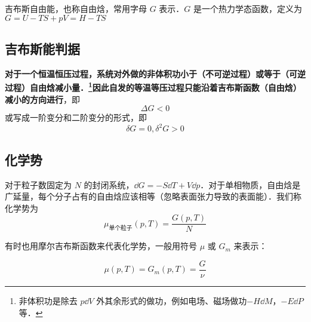 
\begin{issues}
\end{issues}


吉布斯自由能，也称自由焓，常用字母 $G$ 表示．$G$ 是一个热力学态函数，定义为$G=U-TS+pV=H-TS$

\subsection{吉布斯能判据}
\textbf{对于一个恒温恒压过程，系统对外做的非体积功小于（不可逆过程）或等于（可逆过程）自由焓减小量．\footnote{非体积功是除去 $p\dd V$ 外其余形式的做功，例如电场、磁场做功$-H\dd M$，$-E\dd P$ 等．}因此自发的等温等压过程只能沿着吉布斯函数（自由焓）减小的方向进行}，即
\begin{equation}
\Delta G<0
\end{equation}
或写成一阶变分和二阶变分的形式，即
\begin{equation}
\delta G=0,\delta^2 G>0
\end{equation}

\subsection{化学势}

对于粒子数固定为 $N$ 的封闭系统，$\dd G=-S\dd T+V\dd p$．对于单相物质，自由焓是广延量，每个分子占有的自由焓应该相等（忽略表面张力导致的表面能）．我们称化学势为
\begin{equation}
\mu_{\text{单个粒子}}(p,T)=\frac{G(p,T)}{N}
\end{equation}

有时也用摩尔吉布斯函数来代表化学势，一般用符号 $\mu$ 或 $G_m$ 来表示：

\begin{equation}\label{GibbsG_eq1}
\mu(p,T)=G_m(p,T)=\frac{G}{\nu}
\end{equation}

